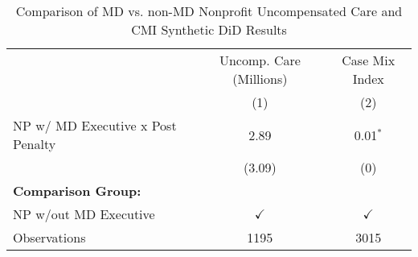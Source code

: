 \begin{table}[ht!]

\caption{\label{tab:MD_noMD_uncompCMI_synth}Comparison of MD vs. non-MD Nonprofit Uncompensated Care and CMI Synthetic DiD Results}
\centering
\begin{tabular}[t]{lcc}
\toprule
\multicolumn{1}{c}{ } & \multicolumn{1}{c}{Uncomp. Care (Millions)} & \multicolumn{1}{c}{Case Mix Index} \\
\cmidrule(l{3pt}r{3pt}){2-2} \cmidrule(l{3pt}r{3pt}){3-3}
 & (1) & (2)\\
\midrule
NP w/ MD Executive x Post Penalty & 2.89 & 0.01$^{*}$\\
 & (3.09) & (0)\\
\textbf{Comparison Group:} &  & \\
NP w/out MD Executive & $\checkmark$ & $\checkmark$\\
Observations & 1195 & 3015\\
\bottomrule
\end{tabular}
\end{table}
